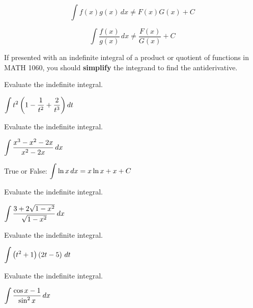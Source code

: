 \documentclass[12pt]{article}
\begin{document}
$$\int f(x)g(x)\,dx\neq F(x)G(x)+C$$

$$\int \frac{f(x)}{g(x)}\,dx\neq\frac{F(x)}{G(x)}+C$$

\vspace{5mm}

If presented with an indefinite integral of a product or quotient of functions in MATH 1060, you should \textbf{simplify} the integrand to find the antiderivative.

\Example Evaluate the indefinite integral. 

\vspace{5mm}

\hspace{10mm} $\displaystyle\int t^2\left( 1-\frac{1}{t^2}+\frac{2}{t^3}\right) dt$

\newpage

\Example Evaluate the indefinite integral. 

\vspace{5mm}

\hspace{10mm} $\displaystyle \int \frac{x^3-x^2-2x}{x^2-2x}\,dx$

\vspace{60mm}

\Example True or False: $\displaystyle\int\ln x\,dx=x\ln x+x+C$

\vspace{50mm}

\Example Evaluate the indefinite integral.

\vspace{5mm}

\hspace{10mm} $\displaystyle\int\frac{3+2\sqrt{1-x^2}}{\sqrt{1-x^2}}\,dx$

\newpage

\Example Evaluate the indefinite integral.

\vspace{5mm}

\hspace{10mm} $\displaystyle\int\left( t^2+1\right)\left( 2t-5\right)\,dt$

\vspace{60mm}

\Example Evaluate the indefinite integral.

\vspace{5mm}

\hspace{10mm} $\displaystyle\int\frac{\cos x - 1}{\sin^2 x}\,dx$

\vspace{60mm}
\end{document}
